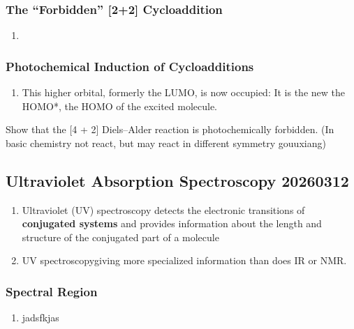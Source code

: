 \subsubsection{The “Forbidden” [2+2] Cycloaddition}

\begin{enumerate}
    \item 
\end{enumerate}

\subsubsection{Photochemical Induction of Cycloadditions}

\begin{enumerate}
    \item This higher orbital, formerly the LUMO, is now occupied: It is the new the HOMO*, the HOMO of the excited molecule.
\end{enumerate}

\begin{example}
    Show that the [4 + 2] Diels–Alder reaction is photochemically forbidden. (In basic chemistry not react, but may react in different symmetry gouuxiang)
\end{example}

\subsection{Ultraviolet Absorption Spectroscopy 20260312}

\begin{enumerate}
    \item Ultraviolet (UV) spectroscopy detects the electronic transitions of \textbf{conjugated systems} and provides information about the length and structure of the conjugated part of a molecule
    
    \item UV spectroscopygiving more specialized information than does IR or NMR.
\end{enumerate}

\subsubsection{Spectral Region}

\begin{enumerate}
    \item jadsfkjas
\end{enumerate}

